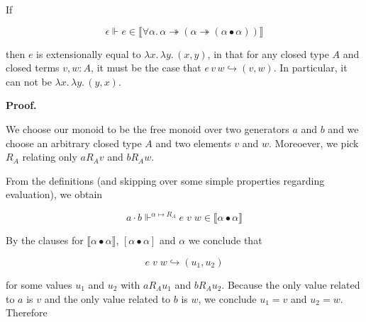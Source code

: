\documentclass[10pt,a4paper]{amsart}
\begin{document}
 
If\par
  
\par  \quad  \[\epsilon\Vdash e\in\llbracket\forall\alpha.\,\alpha\twoheadrightarrow(\alpha\twoheadrightarrow(\alpha\bullet\alpha))\rrbracket\]\quad  \quad  
  
then $e$ is extensionally equal to $\lambda x.\,\lambda y.\,(x,y)$, in that for any closed type $A$ and closed terms $v,w:A$, it must be the case that $e\,v\,w\hookrightarrow(v,w)$. In particular, it can not be $\lambda x.\,\lambda y.\,(y,x)$.\par
 
 
 
 
 
\par\medskip\noindent\textbf{Proof.}\par
 
 
We choose our monoid to be the free monoid over two generators $a$ and $b$ and we choose an arbitrary closed type $A$ and two elements $v$ and $w$. Moreoever, we pick $R_{A}$ relating only $a\mathrel{R_{A}}v$ and $b\mathrel{R_{A}}w$.\par
 
 
 
From the definitions (and skipping over some simple properties regarding evaluation), we obtain\par
  
\par  \quad  \[a\cdot b\Vdash^{\alpha\mapsto R_{A}}e\;v\;w\in\llbracket\alpha\bullet\alpha\rrbracket\]\quad  \quad  
  
By the clauses for $\llbracket\alpha\bullet\alpha\rrbracket$, $[\alpha\bullet\alpha]$ and $\alpha$ we conclude that\par
  
\par  \quad  \[e\;v\;w\mathrel{\hookrightarrow}(u_{1},u_{2})\]\quad  \quad  
  
for some values $u_{1}$ and $u_{2}$ with $a\mathrel{R_{A}}u_{1}$ and $b\mathrel{R_{A}}u_{2}$. Because the only value related to $a$ is $v$ and the only value related to $b$ is $w$, we conclude $u_{1}=v$ and $u_{2}=w$. Therefore\par
  
\end{document}
